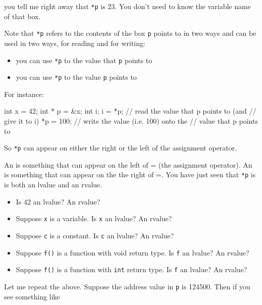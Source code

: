 you tell me right away that \texttt{*p} is 23. You don't need to know the variable name of that box.

Note that \texttt{*p} refers to the contents of the box \texttt{p} points to in two ways and can be used in two ways, for reading and for writing:

\begin{itemize}
\item
  you can use \texttt{*p} to  the value that \texttt{p} points
  to
\item
  you can use \texttt{*p} to  the value \texttt{p} points
  to
\end{itemize}

For instance:

\begin{consolethree}[escapeinside=||]
int x = 42;
int * p = &x;
int i;
i = *p;         // read the value that p points to (and
                // give it to i)
*p = 100;       // write the value (i.e. 100) onto the
                // value that p points to
\end{consolethree}


So \texttt{*p} can appear on either the right or the left of the
assignment operator.

\begin{ex}
An  is something that can appear on the left of = (the assignment operator). An  is something that can appear on the the right of =. You have just seen that \texttt{*p} is is both an lvalue and an rvalue.
\begin{itemize}

\item
  Is 42 an lvalue? An rvalue?
\item
  Suppose \texttt{x} is a variable. Is \texttt{x} an lvalue? An rvalue?
\item
  Suppose \texttt{c} is a constant. Is \texttt{c} an lvalue? An rvalue?
\item
  Suppose \texttt{f()} is a function with void return type. Is \texttt{f} an
  lvalue? An rvalue?
\item
  Suppose \texttt{f()} is a function with \texttt{int} return type. Is
  \texttt{f} an lvalue? An rvalue?
\end{itemize}
\end{ex}

Let me repeat the above. Suppose the address value in \texttt{p} is 124500. Then if you see something like

